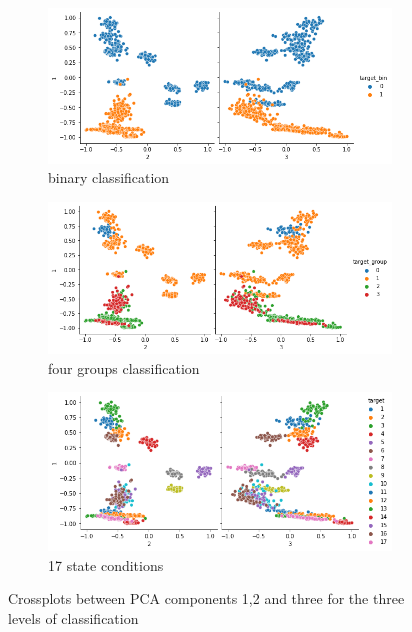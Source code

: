 \documentclass[twocolumn]{article}
\begin{document}
\begin{figure}[H]
      \centering
      \begin{subfigure}{0.4\textwidth}
            \includegraphics[width=\textwidth]{pairplot_bin.png}
            \caption{binary classification}
            \label{fig:pairplot_bin}
      \end{subfigure}
      \begin{subfigure}{0.4\textwidth}
            \centering
            \includegraphics[width=\textwidth]{pairplot_04.png}
            \caption{four groups classification}
            \label{fig:pairplot_04}
      \end{subfigure}
      \begin{subfigure}{0.4\textwidth}
            \centering
            \includegraphics[width=\textwidth]{pairplot_17.png}
            \caption{17 state conditions}
            \label{fig:pairplot_17}
      \end{subfigure}
      \caption{Crossplots between PCA components 1,2 and three for the three levels of classification}
      \label{fig:pairplots}
\end{figure}
\end{document}
